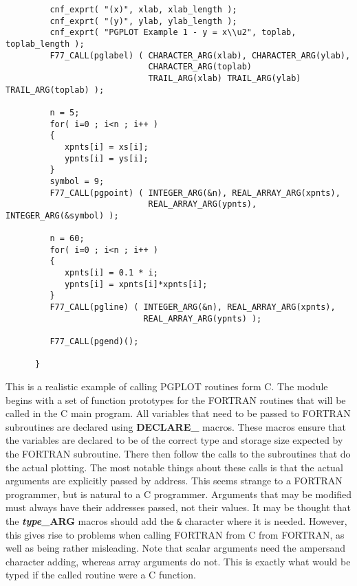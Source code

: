 {\begin{verbatim}
         cnf_exprt( "(x)", xlab, xlab_length );
         cnf_exprt( "(y)", ylab, ylab_length );
         cnf_exprt( "PGPLOT Example 1 - y = x\\u2", toplab, toplab_length );
         F77_CALL(pglabel) ( CHARACTER_ARG(xlab), CHARACTER_ARG(ylab),
                             CHARACTER_ARG(toplab)
                             TRAIL_ARG(xlab) TRAIL_ARG(ylab) TRAIL_ARG(toplab) );

         n = 5;
         for( i=0 ; i<n ; i++ )
         {
            xpnts[i] = xs[i];
            ypnts[i] = ys[i];
         }
         symbol = 9;
         F77_CALL(pgpoint) ( INTEGER_ARG(&n), REAL_ARRAY_ARG(xpnts),
                             REAL_ARRAY_ARG(ypnts), INTEGER_ARG(&symbol) );

         n = 60;
         for( i=0 ; i<n ; i++ )
         {
            xpnts[i] = 0.1 * i;
            ypnts[i] = xpnts[i]*xpnts[i];
         }
         F77_CALL(pgline) ( INTEGER_ARG(&n), REAL_ARRAY_ARG(xpnts),
                            REAL_ARRAY_ARG(ypnts) );

         F77_CALL(pgend)();

      }
\end{verbatim} }

This is a realistic example of calling PGPLOT routines form C. The module
begins with a set of function prototypes for the FORTRAN routines that will be
called in the C main program. All variables that need to be passed to FORTRAN
subroutines are declared using {\bf DECLARE\_} macros. These macros
ensure that the variables are declared to be of the correct type and storage
size expected by the FORTRAN subroutine. There then follow the calls to the
subroutines that do the actual plotting. The most notable things about these
calls is that the actual arguments are explicitly passed by address. This seems
strange to a FORTRAN programmer, but is natural to a C programmer. Arguments
that may be modified must always have their addresses passed, not their values.
It may be thought that the {\bf{\em type}\_ARG} macros should add the {\tt\&}
character where it is needed. However, this gives rise to problems when calling
FORTRAN from C from FORTRAN, as well as being rather misleading. Note that
scalar arguments need the ampersand character adding, whereas array arguments
do not. This is exactly what would be typed if the called routine were a C
function.

